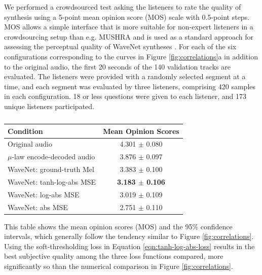 We performed a crowdsourced test asking the listeners to rate the quality of synthesis using a 5-point mean opinion score (MOS) scale with 0.5-point steps.
MOS allows a simple interface that is more suitable for non-expert listeners in a crowdsourcing setup than e.g. MUSHRA  and is used as a standard approach for assessing the perceptual quality of WaveNet syntheses \cite{oord2016wavenet,oord2018parallel}.
For each of the six configurations corresponding to the curves in Figure \ref{fig:correlations}a in addition to the original audio, the first 20 seconds of the 140 validation tracks are evaluated.
The listeners were provided with a randomly selected segment at a time, and each segment was evaluated by three listeners, comprising 420 samples in each configuration.
18 or less questions were given to each listener, and 173 unique listeners participated.

\begin{table}
	\centering
	\begin{tabular}{l|c} 
		Condition & Mean Opinion Scores \\ \hline
		Original audio & 4.301 $\pm$ 0.080 \\
		$\mu$-law encode-decoded audio & 3.876 $\pm$ 0.097 \\
		WaveNet: ground-truth Mel & 3.383 $\pm$ 0.100 \\
		\hline
		WaveNet: tanh-log-abs MSE & \textbf{3.183 $\pm$ 0.106} \\
		WaveNet: log-abs MSE & 3.019 $\pm$ 0.109 \\
		WaveNet: abs MSE & 2.751 $\pm$ 0.110 \\
	\end{tabular}
	\vspace{1em}
	\caption{}\label{tab:synthesis-quality}
\end{table}

This table shows the mean opinion scores (MOS) and the 95\% confidence intervals, which generally follow the tendency similar to Figure \ref{fig:correlations}.
Using the soft-thresholding loss in Equation \ref{eqn:tanh-log-abs-loss} results in the best subjective quality among the three loss functions compared, more significantly so than the numerical comparison in Figure \ref{fig:correlations}.

\setlength{\intextsep}{.1em}
\setlength{\columnsep}{1em}%

